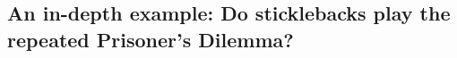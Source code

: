 \subsection{An in-depth example: Do sticklebacks play the repeated
  Prisoner's Dilemma?}
\label{sticklebacks}


